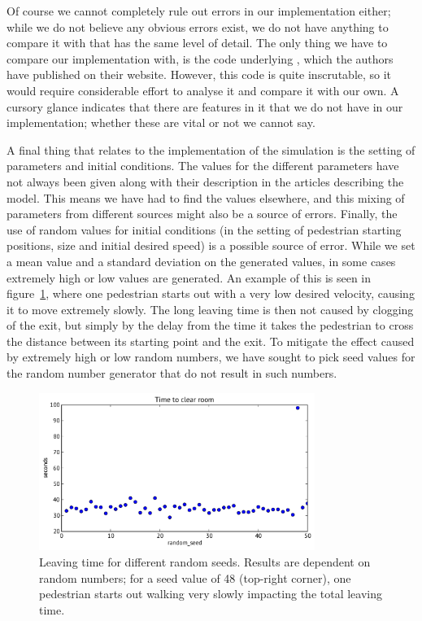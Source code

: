 Of course we cannot completely rule out errors in our implementation either; 
while we do not believe any obvious errors exist, we do not have anything to 
compare it with that has the same level of detail. The only thing we have to 
compare our implementation with, is the code underlying \cite{helbing00}, 
which the authors have published on their website. However, this code is quite 
inscrutable, so it would require considerable effort to analyse it and compare 
it with our own. A cursory glance indicates that there are features in it that 
we do not have in our implementation; whether these are vital or not we cannot 
say.

A final thing that relates to the implementation of the simulation is the 
setting of parameters and initial conditions. The values for the different 
parameters have not always been given along with their description in the 
articles describing the model. This means we have had to find the values 
elsewhere, and this mixing of parameters from different sources might also be 
a source of errors. 
Finally, the use of random values for initial conditions 
(in the setting of pedestrian starting positions, size and initial desired 
speed) is a possible source of error. While we set a mean value and a standard 
deviation on the generated values, in some cases extremely high or low values 
are generated. An example of this is seen in figure~\ref{fig:random-seed}, 
where one pedestrian starts out with a very low desired velocity, causing it 
to move extremely slowly. The long leaving time is then not caused by clogging 
of the exit, but simply by the delay from the time it takes the pedestrian to 
cross the distance between its starting point and the exit. To mitigate the 
effect caused by extremely high or low random numbers, we have sought to pick 
seed values for the random number generator that do not result in such 
numbers.

\begin{figure}[h]
    \centering
    \includegraphics[width=0.8\textwidth]{Figures/random-seed-variations.pdf}
    \caption[Leaving time for different random seeds]{Leaving time for 
    different random seeds. Results are dependent on random numbers; for a 
    seed value of 48 (top-right corner), one pedestrian starts out walking 
    very slowly impacting the total leaving time.}
    \label{fig:random-seed}
\end{figure}


